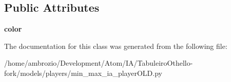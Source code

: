 \subsection*{Public Attributes}
\begin{DoxyCompactItemize}
\item 
\hypertarget{class_tabuleiro_othello-fork_1_1models_1_1players_1_1min__max__ia__player_o_l_d_1_1_minmax_player_a1e1c63610e0a026a8c6190514c04f2ca}{}{\bfseries color}\label{class_tabuleiro_othello-fork_1_1models_1_1players_1_1min__max__ia__player_o_l_d_1_1_minmax_player_a1e1c63610e0a026a8c6190514c04f2ca}

\end{DoxyCompactItemize}


The documentation for this class was generated from the following file\+:\begin{DoxyCompactItemize}
\item 
/home/ambrozio/\+Development/\+Atom/\+I\+A/\+Tabuleiro\+Othello-\/fork/models/players/min\+\_\+max\+\_\+ia\+\_\+player\+O\+L\+D.\+py\end{DoxyCompactItemize}
